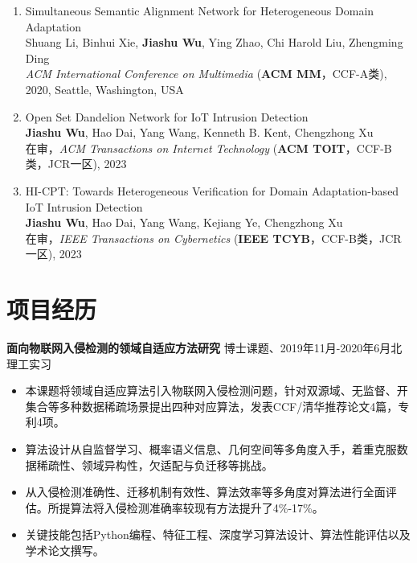 \documentclass[letterpaper,11pt]{article}
\begin{document}
\begin{enumerate}
  \item Simultaneous Semantic Alignment Network for Heterogeneous Domain Adaptation\\
  Shuang Li, Binhui Xie, \textbf{Jiashu Wu}, Ying Zhao, Chi Harold Liu\textsuperscript{\Letter}, Zhengming Ding\\
  \textit{ACM International Conference on Multimedia} (\textbf{ACM MM}，CCF-A类), 2020, Seattle, Washington, USA

  \item Open Set Dandelion Network for IoT Intrusion Detection\\
  \textbf{Jiashu Wu}, Hao Dai, Yang Wang\textsuperscript{\Letter}, Kenneth B. Kent, Chengzhong Xu\\
  在审，\textit{ACM Transactions on Internet Technology} (\textbf{ACM TOIT}，CCF-B类，JCR一区), 2023

  \item HI-CPT: Towards Heterogeneous Verification for Domain Adaptation-based IoT Intrusion Detection\\
  \textbf{Jiashu Wu}, Hao Dai, Yang Wang\textsuperscript{\Letter}, Kejiang Ye, Chengzhong Xu\\
  在审，\textit{IEEE Transactions on Cybernetics} (\textbf{IEEE TCYB}，CCF-B类，JCR一区), 2023
\end{enumerate}




\section{项目经历}

\textbf{面向物联网入侵检测的领域自适应方法研究} \hfill 博士课题、2019年11月-2020年6月北理工实习

\begin{itemize}
  \setlength\itemsep{2pt}
  \item 本课题将领域自适应算法引入物联网入侵检测问题，针对双源域、无监督、开集合等多种数据稀疏场景提出四种对应算法，发表CCF/清华推荐论文4篇，专利4项。
  \item 算法设计从自监督学习、概率语义信息、几何空间等多角度入手，着重克服数据稀疏性、领域异构性，欠适配与负迁移等挑战。
  \item 从入侵检测准确性、迁移机制有效性、算法效率等多角度对算法进行全面评估。所提算法将入侵检测准确率较现有方法提升了4\%-17\%。
  \item 关键技能包括Python编程、特征工程、深度学习算法设计、算法性能评估以及学术论文撰写。
\end{itemize}
\end{document}
